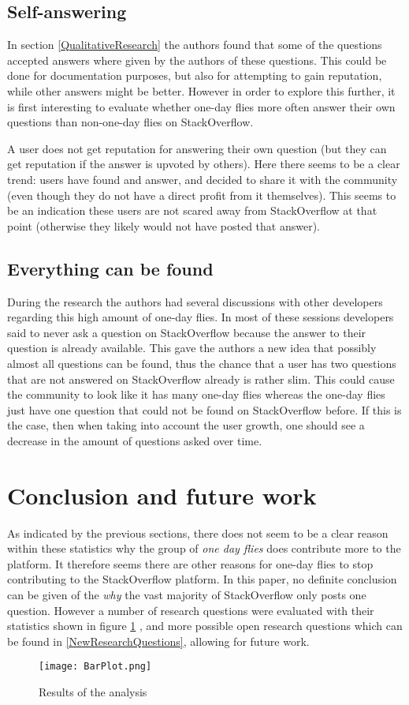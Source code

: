 \documentclass[conference]{IEEEtran}
\begin{document}
\subsection{Self-answering}
In section \ref{QualitativeResearch}  the authors found that some of the questions accepted answers where given by the authors of these questions. This could be done for documentation purposes, but also for attempting to gain reputation, while other answers might be better. However in order to explore this further, it is first interesting to evaluate whether one-day flies more often answer their own questions than non-one-day flies on StackOverflow.

A user does not get reputation for answering their own question (but they can get reputation if the answer is upvoted by others). Here there seems to be a clear trend: users have found and answer, and decided to share it with the community (even though they do not have a direct profit from it themselves). This seems to be an indication these users are not scared away from StackOverflow at that point (otherwise they likely would not have posted that answer). 

\subsection{Everything can be found}
During the research the authors had several discussions with other developers regarding this high amount of one-day flies. In most of these sessions developers said to never ask a question on StackOverflow because the answer to their question is already available. This gave the authors a new idea that possibly almost all questions can be found, thus the chance that a user has two questions that are not answered on StackOverflow already is rather slim. This could cause the community to look like it has many one-day flies whereas the one-day flies just have one question that could not be found on StackOverflow before. If this is the case, then when taking into account the user growth, one should see a decrease in the amount of questions asked over time. 

\section{Conclusion and future work}

As indicated by the previous sections, there does not seem to be a clear reason within these statistics why the group of \textit{one day flies} does contribute more to the platform. It therefore seems there are other reasons for one-day flies to stop contributing to the StackOverflow platform. In this paper, no definite conclusion can be given of the \textit{why} the vast majority of StackOverflow only posts one question. However a number of research questions were evaluated with their statistics shown in figure \ref{finalResults} , and more possible open research questions which can be found in \ref{NewResearchQuestions}, allowing for future work.

\begin{figure}[h]
 \texttt{[image: BarPlot.png]}
 \caption{Results of the analysis}
 \label{finalResults}
\end{figure}





\end{document}
